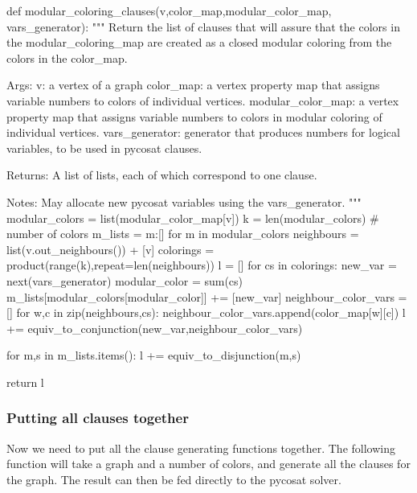 \documentclass[letterpaper]{article}
\begin{document}
\begin{pyblock}
def modular_coloring_clauses(v,color_map,modular_color_map,
                             vars_generator):
   """
   Return the list of clauses that will assure that the colors in 
   the modular_coloring_map are created as a closed modular 
   coloring from the colors in the color_map.

   Args:
      v: a vertex of a graph
      color_map: a vertex property map that assigns variable 
         numbers to colors of individual vertices.
      modular_color_map: a vertex property map that assigns 
         variable numbers to colors in modular coloring of 
         individual vertices.
      vars_generator: generator that produces numbers for logical
         variables, to be used in pycosat clauses.

   Returns:
      A list of lists, each of which correspond to one clause.

   Notes:
      May allocate new pycosat variables using the vars_generator.
   """
   modular_colors = list(modular_color_map[v])
   k = len(modular_colors) # number of colors
   m_lists = {m:[] for m in modular_colors}
   neighbours = list(v.out_neighbours()) + [v]
   colorings = product(range(k),repeat=len(neighbours))
   l = []
   for cs in colorings:
      new_var = next(vars_generator)
      modular_color = sum(cs) %
      m_lists[modular_colors[modular_color]] += [new_var]
      neighbour_color_vars = []
      for w,c in zip(neighbours,cs):
         neighbour_color_vars.append(color_map[w][c])
      l += equiv_to_conjunction(new_var,neighbour_color_vars)

   for m,s in m_lists.items():
      l += equiv_to_disjunction(m,s)

   return l
\end{pyblock}

\subsubsection{Putting all clauses together}

Now we need to put all the clause generating functions together. The following
function will take a graph and a number of colors, and generate all the clauses
for the graph.  The result can then be fed directly to the pycosat solver. 
\end{document}
